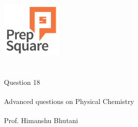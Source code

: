 \documentclass{beamer}
\begin{document}
\begin{center}
\ \\ \ \\
\includegraphics[width=30mm]{Logo-final.png} \\
\ \\ \ \\ 
{\huge Question 18 \\ \ \\ }
{\Large
Advanced questions on Physical Chemistry
}
{\large \ \\ \ \\ Prof. Himanshu Bhutani }
\end{center}
\end{document}
